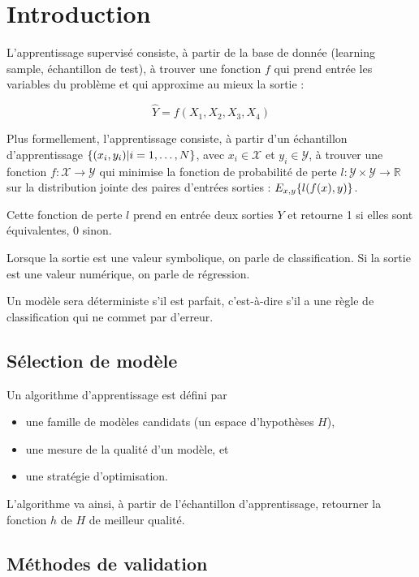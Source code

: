 \chapter{Introduction}
L'apprentissage supervisé consiste, à partir de la base de donnée (learning sample, échantillon de test), à trouver une fonction $f$ qui prend entrée les variables du problème et qui approxime au mieux la sortie :

$$\hat{Y} = f(X_1, X_2, X_3, X_4)$$

Plus formellement, l'apprentissage consiste, à partir d'un échantillon d'apprentissage $\lbrace (x_i, y_i) \vert i = 1, \dots , N \rbrace$, avec $x_i \in \mathcal{X}$ et $y_i \in \mathcal{Y}$, à trouver une fonction $f : \mathcal{X} \rightarrow \mathcal{Y}$ qui minimise la fonction de probabilité de perte $l : \mathcal{Y} \times \mathcal{Y} \rightarrow \mathbb{R}$ sur la distribution jointe des paires d'entrées sorties : $E_{x, y} \lbrace l(f(x), y) \rbrace$.

Cette fonction de perte $l$ prend en entrée deux sorties $Y$ et retourne 1 si elles sont équivalentes, 0 sinon.

Lorsque la sortie est une valeur symbolique, on parle de classification. Si la sortie est une valeur numérique, on parle de régression.

Un modèle sera déterministe s'il est parfait, c'est-à-dire s'il a une règle de classification qui ne commet par d'erreur.

\section{Sélection de modèle}

Un algorithme d'apprentissage est défini par

\begin{itemize}
	\item une famille de modèles candidats (un espace d'hypothèses $H$),
	\item une mesure de la qualité d'un modèle, et
	\item une stratégie d'optimisation.
\end{itemize}

L'algorithme va ainsi, à partir de l'échantillon d'apprentissage, retourner la fonction $h$ de $H$ de meilleur qualité.


\section{Méthodes de validation}

